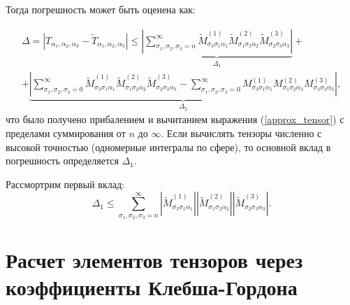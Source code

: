 \documentclass[12pt]{article}
\begin{document}
Тогда погрешность может быть оценена как:

\begin{multline}
  \Delta = \left| T_{\alpha_1, \alpha_2, \alpha_3} - \tilde{T}_{\alpha_1, \alpha_2, \alpha_3} \right| \leq \underbrace{\left| \sum\limits_{\sigma_1, \sigma_2, \sigma_3 = n}^{\infty}\tilde{M}^{(1)}_{\sigma_3\sigma_1\alpha_1}\tilde{M}^{(2)}_{\sigma_1\sigma_2\alpha_2}\tilde{M}^{(3)}_{\sigma_2\sigma_3\alpha_3} \right|}_{\Delta_1} 
  +\\+
  \underbrace{\left| \sum\limits_{\sigma_1, \sigma_2, \sigma_3 = 0}^{\infty}\tilde{M}^{(1)}_{\sigma_3\sigma_1\alpha_1}\tilde{M}^{(2)}_{\sigma_1\sigma_2\alpha_2}\tilde{M}^{(3)}_{\sigma_2\sigma_3\alpha_3} - \sum\limits_{\sigma_1, \sigma_2, \sigma_3 = 0}^{\infty}M^{(1)}_{\sigma_3\sigma_1\alpha_1}M^{(2)}_{\sigma_1\sigma_2\alpha_2}M^{(3)}_{\sigma_2\sigma_3\alpha_3} \right|}_{\Delta_2},
\end{multline}
что было получено прибалением и вычитанием выражения (\ref{approx_tensor}) с пределами суммирования от $n$ до $\infty$.
Если вычислять тензоры численно с высокой точностью (одномерные интегралы по сфере), то основной вклад в погрешность определяется $\Delta_1$.

Рассмортрим первый вклад:
\begin{equation}
  \Delta_1 \leq \sum\limits_{\sigma_1, \sigma_2, \sigma_3 = n}^{\infty}\left|\tilde{M}^{(1)}_{\sigma_3\sigma_1\alpha_1}\right| \left|\tilde{M}^{(2)}_{\sigma_1\sigma_2\alpha_2}\right| \left|\tilde{M}^{(3)}_{\sigma_2\sigma_3\alpha_3} \right|.
\end{equation}


\section{Расчет элементов тензоров через коэффициенты Клебша-Гордона}


\end{document}
